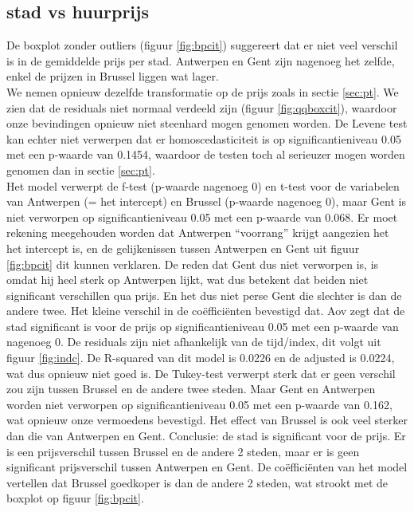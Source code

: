\documentclass[a4paper,kulak]{kulakarticle} %
\begin{document}
\subsection{stad vs huurprijs}
\label{sec:stadvsprijs}
De boxplot zonder outliers (figuur \ref{fig:bpcit}) suggereert  dat er niet veel verschil is in de gemiddelde prijs per stad. Antwerpen en Gent zijn nagenoeg het zelfde, enkel de prijzen in Brussel liggen wat lager. \\
We nemen opnieuw dezelfde transformatie op de prijs zoals in sectie \ref{sec:pt}.
We zien dat de residuals niet normaal verdeeld zijn (figuur \ref{fig:qqboxcit}), waardoor onze bevindingen opnieuw niet steenhard mogen genomen worden. De Levene test kan echter niet verwerpen dat er homoscedasticiteit is op significantieniveau 0.05 met een p-waarde van 0.1454, waardoor de testen toch al serieuzer mogen worden genomen dan in sectie \ref{sec:pt}.\\
Het model verwerpt de f-test (p-waarde nagenoeg 0) en t-test voor de variabelen van Antwerpen (= het intercept) en Brussel (p-waarde nagenoeg 0), maar Gent is niet verworpen op significantieniveau 0.05 met een p-waarde van 0.068. 
Er moet rekening meegehouden worden dat Antwerpen ``voorrang'' krijgt aangezien het het intercept is, en de gelijkenissen tussen Antwerpen en Gent uit figuur \ref*{fig:bpcit} dit kunnen verklaren. 
De reden dat Gent dus niet verworpen is, is omdat hij heel sterk op Antwerpen lijkt, wat dus betekent dat beiden niet significant verschillen qua prijs.
En het dus niet perse Gent die slechter is dan de andere twee. Het kleine verschil in de coëfficiënten bevestigd dat.
Aov zegt dat de stad significant is voor de prijs op significantieniveau 0.05 met een p-waarde van nagenoeg 0. 
De residuals zijn niet afhankelijk van de tijd/index, dit volgt uit figuur \ref{fig:indc}.
De R-squared van dit model is 0.0226 en de adjusted is 0.0224, wat dus opnieuw niet goed is.
De Tukey-test verwerpt sterk dat er geen verschil zou zijn tussen Brussel en de andere twee steden. Maar Gent en Antwerpen worden niet verworpen op significantieniveau 0.05 met een p-waarde van 0.162, wat opnieuw onze vermoedens bevestigd. 
Het effect van Brussel is ook veel sterker dan die van Antwerpen en Gent. 
Conclusie: de stad is significant voor de prijs. Er is een prijsverschil tussen Brussel en de andere 2 steden, maar er is geen significant prijsverschil tussen Antwerpen en Gent.
De coëfficiënten van het model vertellen dat Brussel goedkoper is dan de andere 2 steden, wat strookt met de boxplot op figuur \ref{fig:bpcit}.
\end{document}
